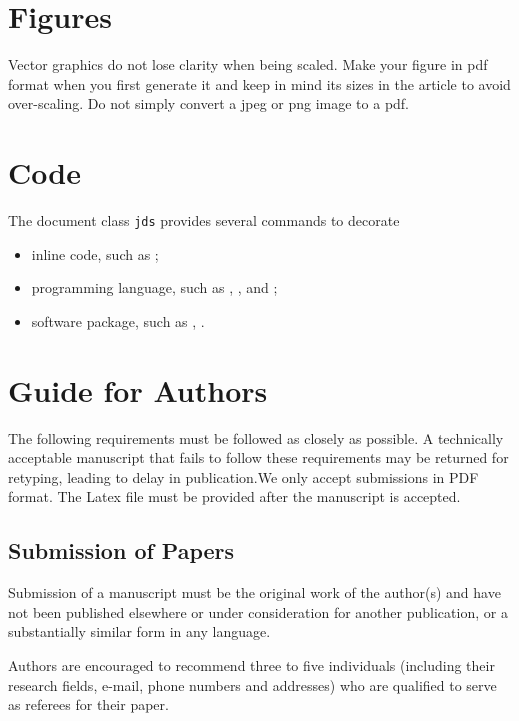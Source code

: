 \documentclass[letterpaper, inpress]{jds} %
\begin{document}
\section{Figures}%
\label{sec:figs}

Vector graphics do not lose clarity when being scaled. Make your
figure in pdf format when you first generate it and keep in mind its
sizes in the article to avoid over-scaling. Do not simply convert a
jpeg or png image to a pdf.

\section{Code}%
\label{sec:code}

The document class \texttt{jds} provides several commands to decorate
\begin{itemize}
\item inline code, such as ;
\item programming language, such as , , and
  ;
\item software package, such as , .
\end{itemize}


\section{Guide for Authors}%
\label{sec:guide-authors}

The following requirements must be followed as closely as possible. A
technically acceptable manuscript that fails to follow these requirements may be
returned for retyping, leading to delay in publication.We only accept
submissions in PDF format. The Latex file must be provided after the manuscript
is accepted.

\subsection{Submission of Papers}

Submission of a manuscript must be the original work of the author(s) and have
not been published elsewhere or under consideration for another publication, or
a substantially similar form in any language.

Authors are encouraged to recommend three to five individuals (including their
research fields, e-mail, phone numbers and addresses) who are qualified to serve
as referees for their paper.
\end{document}
